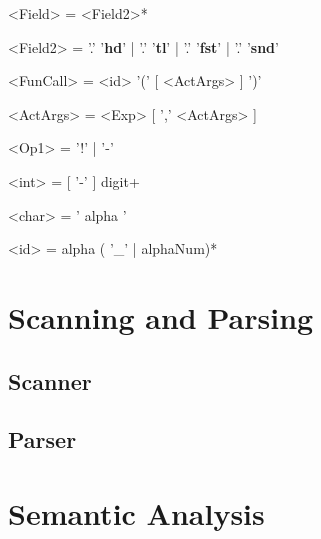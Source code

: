 \documentclass{article}
\begin{document}
\begin{grammar}
<Field> = <Field2>*

<Field2> = '.' '\textbf{hd}' | '.' '\textbf{tl}' | '.' '\textbf{fst}' | '.' '\textbf{snd}'

<FunCall> = <id> '(' [ <ActArgs> ] ')'

<ActArgs> = <Exp> [ ',' <ActArgs> ]

<Op1> = '!' | '-'

<int> = [ '-' ] digit+

<char> = ' alpha '

<id> = alpha ( '\_' | alphaNum)*
\end{grammar}

\section{Scanning and Parsing}
\subsection{Scanner}

\subsection{Parser}

\section{Semantic Analysis}
\end{document}
